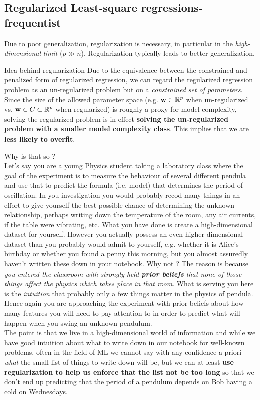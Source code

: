 \subsection{Regularized Least-square regressions-frequentist}
Due to poor generalization, regularization is necessary, in particular  in the \emph{high-dimensional limit} ($p\gg n$). Regularization typically leads to better generalization. 
\begin{mybox}{Idea behind regularization}
	Due to the equivalence between the constrained and penalized form of regularized regression, we can regard the regularized regression problem as an un-regularized problem but on a \emph{constrained set of parameters}. Since the size of the allowed parameter space (e.g. $\mathbf{w} \in \mathbb{R}^p$ when un-regularized vs. $\mathbf{w} \in C \subset \mathbb{R}^p$ when regularized) is roughly a proxy for model complexity, solving the regularized problem is in effect \textbf{solving the un-regularized problem with a smaller model complexity class}. This implies that we are \textbf{less likely to overfit}.
\end{mybox}
Why is that so ?\\
Let's say you are a young Physics student taking a laboratory class where the goal of the experiment is to measure the behaviour of several different pendula and use that to predict the formula (i.e. model) that determines the period of oscillation. In you investigation you would probably recod many things in an effort to give yourself the best possible chance of determining the unknown relationship, perhaps writing down the temperature of the room, any air currents, if the table were vibrating, etc. What you have done is create a high-dimensional dataset for yourself. However you actually possess an even higher-dimensional dataset than you probably would admit to yourself, e.g. whether it is Alice's birthday or whether you found a penny this morning, but you almost assuredly haven't written these down in your notebook. Why not ? The reason is because \emph{you entered the classroom with strongly held \textbf{prior beliefs} that none of those things affect the physics which takes place in that room}. What is serving you here is the \emph{intuition} that probably only a few things matter in the physics of pendula. Hence again you are approaching the experiment with prior beliefs about how many features you will need to pay attention to in order to predict what will happen when you swing an unknown pendulum.\\
The point is that we live in a high-dimensional world of information and while we have good intuition about what to write down in our notebook for well-known problems, often in the field of ML we cannot say with any confidence a priori \emph{what} the small list of things to write down will be, but we can at least \textbf{use regularization to help us enforce that the list not be too long} so that we don't end up predicting that the period of a pendulum depends on Bob having a cold on Wednesdays.
